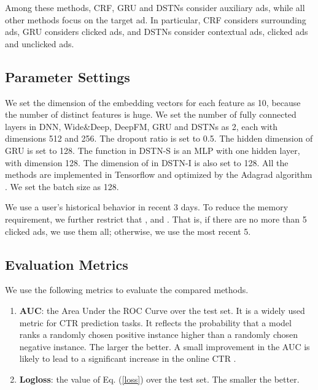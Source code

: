 \documentclass[sigconf]{acmart}
\begin{document}
Among these methods, CRF, GRU and DSTNs consider auxiliary ads, while all other methods focus on the target ad. In particular, CRF considers surrounding ads, GRU considers clicked ads, and DSTNs consider contextual ads, clicked ads and unclicked ads.

\subsection{Parameter Settings}
We set the dimension of the embedding vectors for each feature as 10, because the number of distinct features is huge.
We set the number of fully connected layers in DNN, Wide\&Deep, DeepFM, GRU and DSTNs as 2, each with dimensions 512 and 256. The dropout ratio is set to 0.5. The hidden dimension of GRU is set to 128. The  function in DSTN-S is an MLP with one hidden layer, with dimension 128. The dimension of  in DSTN-I is also set to 128. All the methods are implemented in Tensorflow and optimized by the Adagrad algorithm \cite{duchi2011adaptive}. We set the batch size as 128.

We use a user's historical behavior in recent 3 days. To reduce the memory requirement, we further restrict that ,  and . That is, if there are no more than 5 clicked ads, we use them all; otherwise, we use the most recent 5.

\subsection{Evaluation Metrics}
We use the following metrics to evaluate the compared methods.
\begin{enumerate}
\item \textbf{AUC}: the Area Under the ROC Curve over the test set. It is a widely used metric for CTR prediction tasks. It reflects the probability that a model ranks a randomly chosen positive instance higher than a randomly chosen negative instance. The larger the better. A small improvement in the AUC is likely to lead to a significant increase in the online CTR \cite{cheng2016wide}.
\item \textbf{Logloss}: the value of Eq. (\ref{loss}) over the test set. The smaller the better.
\end{enumerate}
\end{document}
